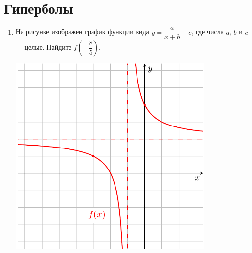 \documentclass[12pt, a4paper]{article}
\begin{document}
\section{Гиперболы}
\begin{enumerate}
	\item 
	\begin{minipage}[t][8cm][t]{0.5\textwidth}
		На рисунке изображен график функции вида $y=\dfrac{a}{x+b}+c$, где числа $a$, $b$ и $c$ — целые. Найдите $f\left(-\dfrac{8}{5}\right)$.
		\begin{flushright}
		\end{flushright}
	\end{minipage}
	\begin{minipage}[t][8cm][t]{0.5\textwidth}
		\hspace{10pt}
		\includegraphics[align=t, width=0.8\textwidth]{graphs/graph_2/graph_2}
	\end{minipage}
	
\end{enumerate}
\end{document}
